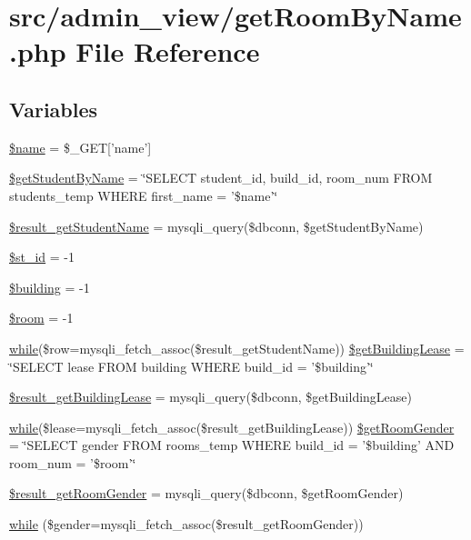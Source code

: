 \hypertarget{getRoomByName_8php}{\section{src/admin\-\_\-view/get\-Room\-By\-Name.php \-File \-Reference}
\label{getRoomByName_8php}
}
\subsection*{\-Variables}
\begin{DoxyCompactItemize}
\item 
\hyperlink{getRoomByName_8php_ab2fc40d43824ea3e1ce5d86dee0d763b}{\$name} = \$\-\_\-\-G\-E\-T\mbox{[}'name'\mbox{]}
\item 
\hyperlink{getRoomByName_8php_a9c22ac0190343cdfc8749288791a05cf}{\$get\-Student\-By\-Name} = \char`\"{}\-S\-E\-L\-E\-C\-T student\-\_\-id, build\-\_\-id, room\-\_\-num \-F\-R\-O\-M students\-\_\-temp \-W\-H\-E\-R\-E first\-\_\-name = '\$name'\char`\"{}
\item 
\hyperlink{getRoomByName_8php_af6869910e8818d12be3041b40f6ddf80}{\$result\-\_\-get\-Student\-Name} = mysqli\-\_\-query(\$dbconn, \$get\-Student\-By\-Name)
\item 
\hyperlink{getRoomByName_8php_ab68b86e23fd74e101c03130a49b24f66}{\$st\-\_\-id} = -\/1
\item 
\hyperlink{getRoomByName_8php_a903ab1c50249715a442ce81e6d5ba775}{\$building} = -\/1
\item 
\hyperlink{getRoomByName_8php_ab285a2e759ea45a70f8ff40a63d2fe89}{\$room} = -\/1
\item 
\hyperlink{studentForm_8php_abeb5d2366a9870820ffb1e260d040d8d}{while}(\$row=mysqli\-\_\-fetch\-\_\-assoc(\$result\-\_\-get\-Student\-Name)) \hyperlink{getRoomByName_8php_a8befb25356d16681c16aaff83db4e3fc}{\$get\-Building\-Lease} = \char`\"{}\-S\-E\-L\-E\-C\-T lease \-F\-R\-O\-M building \-W\-H\-E\-R\-E build\-\_\-id = '\$building'\char`\"{}
\item 
\hyperlink{getRoomByName_8php_a85b7461a0b78e5b681f1c7c5c6b4654c}{\$result\-\_\-get\-Building\-Lease} = mysqli\-\_\-query(\$dbconn, \$get\-Building\-Lease)
\item 
\hyperlink{studentForm_8php_abeb5d2366a9870820ffb1e260d040d8d}{while}(\$lease=mysqli\-\_\-fetch\-\_\-assoc(\$result\-\_\-get\-Building\-Lease)) \hyperlink{getRoomByName_8php_a65a823b86bd329b8545e10df6a4bc325}{\$get\-Room\-Gender} = \char`\"{}\-S\-E\-L\-E\-C\-T gender \-F\-R\-O\-M rooms\-\_\-temp \-W\-H\-E\-R\-E build\-\_\-id = '\$building' \-A\-N\-D room\-\_\-num = '\$room'\char`\"{}
\item 
\hyperlink{getRoomByName_8php_a9ce0616f2a54ee7e19e22d0bb7c4c1c7}{\$result\-\_\-get\-Room\-Gender} = mysqli\-\_\-query(\$dbconn, \$get\-Room\-Gender)
\item 
\hyperlink{getRoomByName_8php_a47624afeb833a11e7095ab00ea7bd2ea}{while} (\$gender=mysqli\-\_\-fetch\-\_\-assoc(\$result\-\_\-get\-Room\-Gender))
\end{DoxyCompactItemize}


